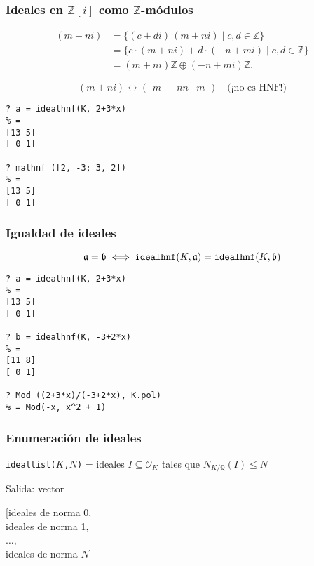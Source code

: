 \documentclass{beamer}
\newcommand{\ZZ}{\mathbb{Z}}
\newcommand{\QQ}{\mathbb{Q}}
\renewcommand{\O}{\mathcal{O}}
\begin{document}

\begin{frame}[fragile]
  \frametitle{Ideales en $\ZZ [i]$ como $\ZZ$-módulos}

  \begin{align*}
    (m+ni) & = \{(c + di)\,(m + ni) \mid c, d \in \ZZ \} \\
    & = \{ c \cdot (m + ni) + d \cdot (-n + mi) \mid c, d \in \ZZ \} \\
    & = (m + ni) \ZZ \oplus (-n + mi) \ZZ.
  \end{align*}

  \[ (m+ni) \longleftrightarrow \begin{pmatrix}
    m & -n
    n & m
  \end{pmatrix} \quad \text{(¡no es HNF!)} \]

  \begin{shaded}\small
\begin{verbatim}
? a = idealhnf(K, 2+3*x)
% = 
[13 5]
[ 0 1]

? mathnf ([2, -3; 3, 2])
% = 
[13 5]
[ 0 1]
\end{verbatim}
  \end{shaded}
\end{frame}


\begin{frame}[fragile]
  \frametitle{Igualdad de ideales}

  \[ \mathfrak{a} = \mathfrak{b} \iff \text{\tt idealhnf}(K,\mathfrak{a}) = \text{\tt idealhnf}(K,\mathfrak{b}) \]

  \begin{shaded}
\begin{verbatim}
? a = idealhnf(K, 2+3*x)
% = 
[13 5]
[ 0 1]

? b = idealhnf(K, -3+2*x)
% =
[11 8]
[ 0 1]

? Mod ((2+3*x)/(-3+2*x), K.pol)
% = Mod(-x, x^2 + 1)
\end{verbatim}
  \end{shaded}
\end{frame}


\begin{frame}[fragile]
  \frametitle{Enumeración de ideales}

  \texttt{ideallist($K$,$N$)} = ideales $I \subseteq \O_K$ tales que $N_{K/\QQ} (I) \le N$


  Salida: vector

  \begin{center}
    [ideales de norma 0,\\
      ideales de norma 1,\\
      $\ldots$,\\
      ideales de norma $N$]
  \end{center}
\end{frame}
\end{document}
